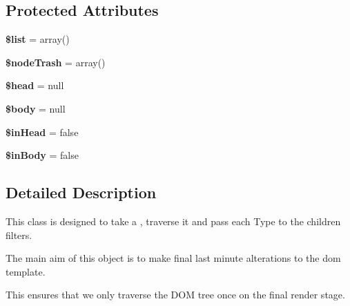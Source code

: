 \subsection*{Protected Attributes}
\begin{DoxyCompactItemize}
\item 
\hypertarget{classTk_1_1Dom_1_1Modifier_1_1Modifier_a45e947f4b29f3df18cbb0dd0aa3d9250}{{\bfseries \$list} = array()}\label{classTk_1_1Dom_1_1Modifier_1_1Modifier_a45e947f4b29f3df18cbb0dd0aa3d9250}

\item 
\hypertarget{classTk_1_1Dom_1_1Modifier_1_1Modifier_a0e8a73527375d16c1216845349eabc36}{{\bfseries \$node\+Trash} = array()}\label{classTk_1_1Dom_1_1Modifier_1_1Modifier_a0e8a73527375d16c1216845349eabc36}

\item 
\hypertarget{classTk_1_1Dom_1_1Modifier_1_1Modifier_a4b5d1418302e249c02abe5656d08e5da}{{\bfseries \$head} = null}\label{classTk_1_1Dom_1_1Modifier_1_1Modifier_a4b5d1418302e249c02abe5656d08e5da}

\item 
\hypertarget{classTk_1_1Dom_1_1Modifier_1_1Modifier_aeb1b65250c955fa7eeabd243dc09547b}{{\bfseries \$body} = null}\label{classTk_1_1Dom_1_1Modifier_1_1Modifier_aeb1b65250c955fa7eeabd243dc09547b}

\item 
\hypertarget{classTk_1_1Dom_1_1Modifier_1_1Modifier_a9e43ab9709b43d03c85ac65ffe3f5172}{{\bfseries \$in\+Head} = false}\label{classTk_1_1Dom_1_1Modifier_1_1Modifier_a9e43ab9709b43d03c85ac65ffe3f5172}

\item 
\hypertarget{classTk_1_1Dom_1_1Modifier_1_1Modifier_a1b7e186580afa2a4adf0a691fe64f36b}{{\bfseries \$in\+Body} = false}\label{classTk_1_1Dom_1_1Modifier_1_1Modifier_a1b7e186580afa2a4adf0a691fe64f36b}

\end{DoxyCompactItemize}


\subsection{Detailed Description}
This class is designed to take a , traverse it and pass each Type to the children filters.

The main aim of this object is to make final last minute alterations to the dom template.

This ensures that we only traverse the D\+O\+M tree once on the final render stage.

